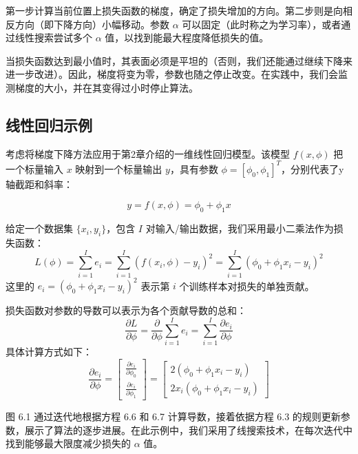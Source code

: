 第一步计算当前位置上损失函数的梯度，确定了损失增加的方向。第二步则是向相反方向（即下降方向）小幅移动。参数 \(\alpha\) 可以固定（此时称之为学习率），或者通过线性搜索尝试多个 \(\alpha\) 值，以找到能最大程度降低损失的值。

当损失函数达到最小值时，其表面必须是平坦的（否则，我们还能通过继续下降来进一步改进）。因此，梯度将变为零，参数也随之停止改变。在实践中，我们会监测梯度的大小，并在其变得过小时停止算法。

\subsection{线性回归示例}

考虑将梯度下降方法应用于第2章介绍的一维线性回归模型。该模型 \(f(x, \phi)\) 把一个标量输入 \(x\) 映射到一个标量输出 \(y\)，具有参数 \(\phi = [\phi_0, \phi_1]^T\)，分别代表了y轴截距和斜率：

\begin{equation}
y = f(x, \phi) = \phi_0 + \phi_1x 
\end{equation}

给定一个数据集 \(\{x_i, y_i\}\)，包含 \(I\) 对输入/输出数据，我们采用最小二乘法作为损失函数：
\begin{equation}
L(\phi) = \sum_{i=1}^I e_i = \sum_{i=1}^I (f(x_i, \phi) - y_i)^2 = \sum_{i=1}^I (\phi_0 + \phi_1x_i - y_i)^2 
\end{equation}
这里的 \(e_i = (\phi_0 + \phi_1x_i - y_i)^2\) 表示第 \(i\) 个训练样本对损失的单独贡献。

损失函数对参数的导数可以表示为各个贡献导数的总和：
\begin{equation}
\frac{\partial L}{\partial \phi} = \frac{\partial}{\partial \phi} \sum_{i=1}^I e_i = \sum_{i=1}^I \frac{\partial e_i}{\partial \phi} 
\end{equation}
具体计算方式如下：
\begin{equation}
\frac{\partial e_i}{\partial \phi} = 
\begin{bmatrix}
\frac{\partial e_i}{\partial \phi_0}  \\
\frac{\partial e_i}{\partial \phi_1} 
\end{bmatrix} =
\begin{bmatrix}
2(\phi_0 + \phi_1x_i - y_i)  \\
2x_i(\phi_0 + \phi_1x_i - y_i)  
\end{bmatrix} 
\end{equation}

图 6.1 通过迭代地根据方程 6.6 和 6.7 计算导数，接着依据方程 6.3 的规则更新参数，展示了算法的逐步进展。在此示例中，我们采用了线搜索技术，在每次迭代中找到能够最大限度减少损失的 \(\alpha\) 值。

